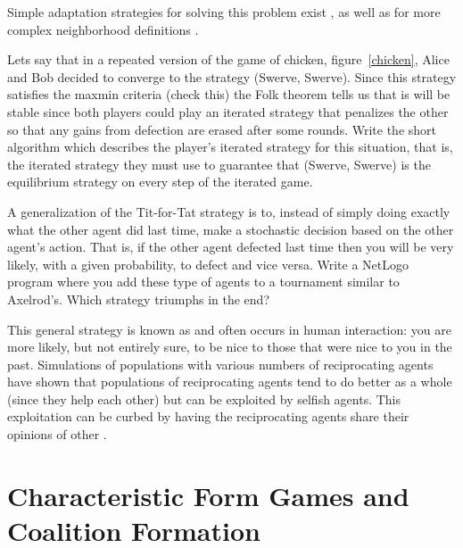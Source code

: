 \begin{exercises}
  Simple adaptation strategies for solving this problem exist
  \cite{shoham97a}, as well as for more complex neighborhood
  definitions \cite{delgado02a}.

\item Lets say that in a repeated version of the game of chicken,
  figure~\ref{chicken}, Alice and Bob decided to converge to the
  strategy (Swerve, Swerve). Since this strategy satisfies the
  maxmin criteria (check this) the Folk theorem tells us that is will
  be stable since both players could play an iterated strategy that
  penalizes the other so that any gains from defection are erased
  after some rounds. Write the short algorithm which describes the
  player's iterated strategy for this situation, that is, the iterated
  strategy they must use to guarantee that (Swerve, Swerve) is the
  equilibrium strategy on every step of the iterated game.

\item A generalization of the Tit-for-Tat strategy is to, instead of
  simply doing exactly what the other agent did last time, make a
  stochastic decision based on the other agent's action. That is, if
  the other agent defected last time then you will be very likely,
  with a given probability, to defect and vice versa. Write a NetLogo
  program where you add these type of agents to a tournament similar
  to Axelrod's. Which strategy triumphs in the end?

   This general strategy is known as
   and often occurs in human interaction: you are
  more likely, but not entirely sure, to be nice to those that were
  nice to you in the past. Simulations of populations with various
  numbers of reciprocating agents have shown that populations of
  reciprocating agents tend to do better as a whole (since they help
  each other) but can be exploited by selfish agents. This
  exploitation can be curbed by having the reciprocating agents share
  their opinions of other \cite{sen02b}.

\end{exercises}


\chapter{Characteristic Form Games and Coalition Formation}
\label{sec:games-char-form}

